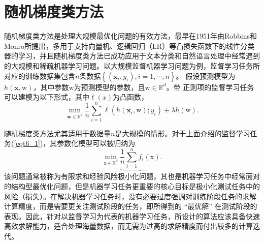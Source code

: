 \section{随机梯度类方法}
随机梯度类方法是处理大规模最优化问题的有效方法，最早在1951年由Robbins和Monro所提出\cite{SGD}，多用于支持向量机、逻辑回归（LR）等凸损失函数下的线性分类器的学习，并且随机梯度类方法已成功应用于文本分类和自然语言处理中经常遇到的大规模和稀疏机器学习问题。以大规模监督机器学习问题为例，监督学习任务所对应的训练数据集包含$n$条数据$\left\{\left(\bm{x}_{i}, y_{i}\right), i=1, \cdots, n\right\}$。 假设预测模型为$h(\bm{x}, \mathrm{w})$，其中参数$\mathrm{w}$为预测模型的参数，且$\mathrm{w} \in \mathbb{R}^{d}$。带 正则项的监督学习任务可以建模为以下形式，其中$\ell(x)$为凸函数，
\begin{equation}
    \min _{\mathbf{w} \in \mathbb{R}^{d}} \frac{1}{n} \sum_{i=1}^{n} \ell\left(h\left(\bm{x}_{i}, \mathrm{w}\right) ; y_{i}\right)+\lambda h(\mathrm{w})
    \text {.}
    \label{eqt6_1}
\end{equation}

\par 随机梯度类方法尤其适用于数据量$n$是大规模的情形。对于上面介绍的监督学习任务(\ref{eqt6_1})，其参数化模型可以被归纳为
\begin{equation}
    \min _{\mathrm{x} \in \mathbb{R}^{d}} \underbrace{\frac{1}{n} \sum_{i=1}^{n} f_{i}(\mathrm{x})}
    \label{eqt6_2}
    \text {.}
\end{equation}
该问题通常被称为有限求和经验风险极小化问题，其也是机器学习任务中经常面对的结构型最优化问题，但是机器学习任务更重要的核心目标是极小化测试任务中的风险（损失）。在解决机器学习任务时，没有必要过度强调对训练阶段任务的求解计算精度，而是需要更关注测试阶段的任务，即所得到的 “最优解” 在测试阶段的表现。因此，针对以监督学习为代表的机器学习任务，所设计的算法应该具备快速高效求解能力，适合处理海量数据，而无需为过高的求解精度而付出较多的计算迭代。

